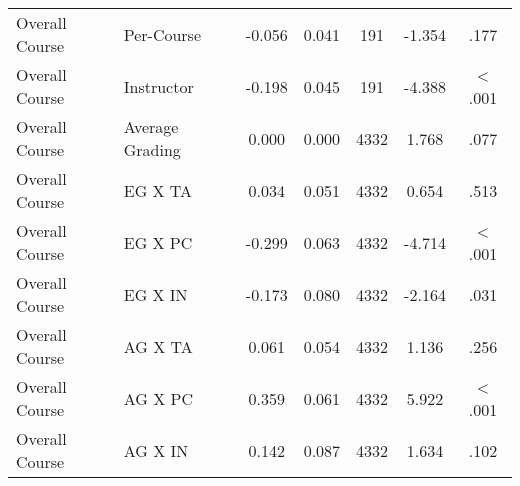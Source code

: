 \documentclass[man]{apa6}
\theoremstyle{definition}
\theoremstyle{definition}
\theoremstyle{definition}
\theoremstyle{remark}
\begin{document}
\begin{table}[tbp]
\begin{center}
\begin{threeparttable}
\begin{tabular}{llccccc}
Overall Course & Per-Course & -0.056 & 0.041 & 191 & -1.354 & .177\\
Overall Course & Instructor & -0.198 & 0.045 & 191 & -4.388 & < .001\\
Overall Course & Average Grading & 0.000 & 0.000 & 4332 & 1.768 & .077\\
Overall Course & EG X TA & 0.034 & 0.051 & 4332 & 0.654 & .513\\
Overall Course & EG X PC & -0.299 & 0.063 & 4332 & -4.714 & < .001\\
Overall Course & EG X IN & -0.173 & 0.080 & 4332 & -2.164 & .031\\
Overall Course & AG X TA & 0.061 & 0.054 & 4332 & 1.136 & .256\\
Overall Course & AG X PC & 0.359 & 0.061 & 4332 & 5.922 & < .001\\
Overall Course & AG X IN & 0.142 & 0.087 & 4332 & 1.634 & .102\\
\bottomrule
\end{tabular}
\end{threeparttable}
\end{center}
\end{table}
\end{document}
